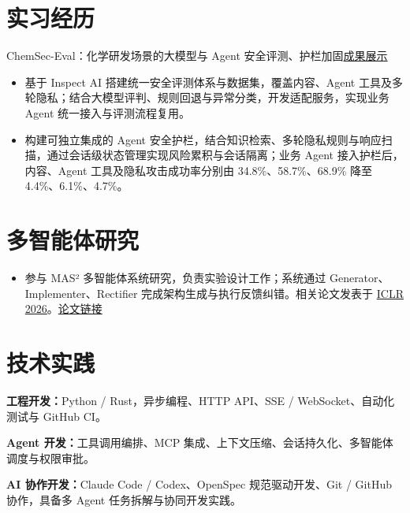 \documentclass{resume}
\newcommand{\metainfo}[1]{{\fontsize{9.6}{13.7}\selectfont\color{muted}#1\par}\vspace{1.5pt}}
\newcommand{\projectlink}[2]{\href{#1}{\textcolor{muted}{#2}}}
\newcommand{\cvsection}[2]{\section{\texorpdfstring{\makebox[1.35em][l]{\normalfont #1}}{}#2}}
\begin{document}
\cvsection{\faBriefcase}{实习经历}
\metainfo{ChemSec-Eval：化学研发场景的大模型与 Agent 安全评测、护栏加固\quad\projectlink{https://1371149.github.io/jingtai.github.io/}{成果展示}}
\begin{itemize}
  \item 基于 Inspect AI 搭建统一安全评测体系与数据集，覆盖内容、Agent 工具及多轮隐私；结合大模型评判、规则回退与异常分类，开发适配服务，实现业务 Agent 统一接入与评测流程复用。
  \item 构建可独立集成的 Agent 安全护栏，结合知识检索、多轮隐私规则与响应扫描，通过会话级状态管理实现风险累积与会话隔离；业务 Agent 接入护栏后，内容、Agent 工具及隐私攻击成功率分别由 \mbox{34.8\%、58.7\%、68.9\%} 降至 \mbox{4.4\%、6.1\%、4.7\%。}
\end{itemize}

\cvsection{\faFlask}{多智能体研究}
\begin{itemize}
  \item 参与 MAS² 多智能体系统研究，负责实验设计工作；系统通过 Generator、Implementer、Rectifier 完成架构生成与执行反馈纠错。相关论文发表于 \href{https://iclr.cc/virtual/2026/poster/10007200}{ICLR 2026}。\quad\projectlink{https://openreview.net/forum?id=qumy27hMDY}{论文链接}
\end{itemize}

\cvsection{\faCogs}{技术实践}
\textbf{工程开发：}Python / Rust，异步编程、HTTP API、SSE / WebSocket、自动化测试与 GitHub CI。\par
\textbf{Agent 开发：}工具调用编排、MCP 集成、上下文压缩、会话持久化、\mbox{多智能体调度与权限审批。}\par
\textbf{AI 协作开发：}Claude Code / Codex、OpenSpec 规范驱动开发、Git / GitHub 协作，具备多 Agent 任务拆解与协同开发实践。
\end{document}
